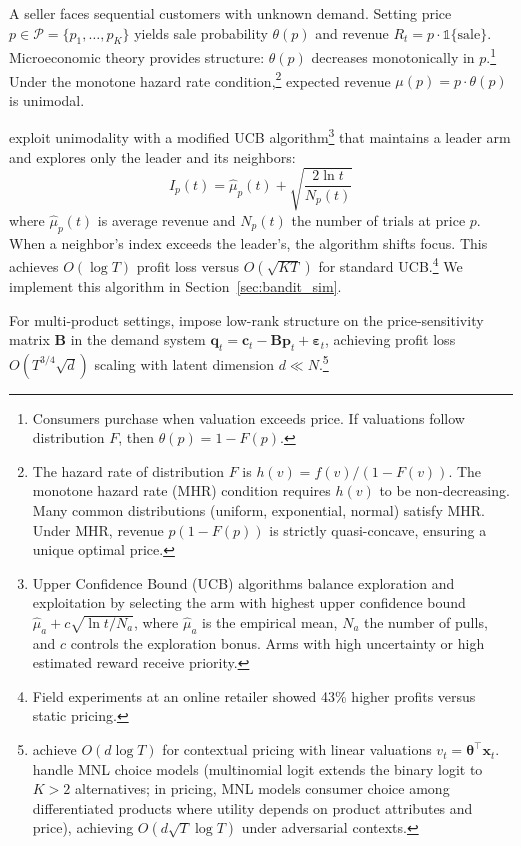 A seller faces sequential customers with unknown demand. Setting price $p \in \mathcal{P} = \{p_1, \ldots, p_K\}$ yields sale probability $\theta(p)$ and revenue $R_t = p \cdot \mathbb{1}\{\text{sale}\}$. Microeconomic theory provides structure: $\theta(p)$ decreases monotonically in $p$.\footnote{Consumers purchase when valuation exceeds price. If valuations follow distribution $F$, then $\theta(p) = 1 - F(p)$.} Under the monotone hazard rate condition,\footnote{The hazard rate of distribution $F$ is $h(v) = f(v)/(1-F(v))$. The monotone hazard rate (MHR) condition requires $h(v)$ to be non-decreasing. Many common distributions (uniform, exponential, normal) satisfy MHR. Under MHR, revenue $p(1-F(p))$ is strictly quasi-concave, ensuring a unique optimal price.} expected revenue $\mu(p) = p \cdot \theta(p)$ is unimodal.

\citet{Misra2019} exploit unimodality with a modified UCB algorithm\footnote{Upper Confidence Bound (UCB) algorithms balance exploration and exploitation by selecting the arm with highest upper confidence bound $\hat{\mu}_a + c\sqrt{\ln t / N_a}$, where $\hat{\mu}_a$ is the empirical mean, $N_a$ the number of pulls, and $c$ controls the exploration bonus. Arms with high uncertainty or high estimated reward receive priority.} that maintains a leader arm and explores only the leader and its neighbors:
\begin{equation}
I_p(t) = \hat{\mu}_p(t) + \sqrt{\frac{2\ln t}{N_p(t)}}
\end{equation}
where $\hat{\mu}_p(t)$ is average revenue and $N_p(t)$ the number of trials at price $p$. When a neighbor's index exceeds the leader's, the algorithm shifts focus. This achieves $O(\log T)$ profit loss versus $O(\sqrt{KT})$ for standard UCB.\footnote{Field experiments at an online retailer showed 43\% higher profits versus static pricing.} We implement this algorithm in Section~\ref{sec:bandit_sim}.

For multi-product settings, \citet{Mueller2019} impose low-rank structure on the price-sensitivity matrix $\mathbf{B}$ in the demand system $\mathbf{q}_t = \mathbf{c}_t - \mathbf{B}\mathbf{p}_t + \boldsymbol{\varepsilon}_t$, achieving profit loss $O(T^{3/4}\sqrt{d})$ scaling with latent dimension $d \ll N$.\footnote{\citet{Xu2021} achieve $O(d \log T)$ for contextual pricing with linear valuations $v_t = \boldsymbol{\theta}^\top \mathbf{x}_t$. \citet{Goyal2022} handle MNL choice models (multinomial logit extends the binary logit to $K > 2$ alternatives; in pricing, MNL models consumer choice among differentiated products where utility depends on product attributes and price), achieving $O(d\sqrt{T}\log T)$ under adversarial contexts.}


